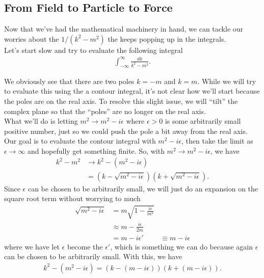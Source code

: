 \documentclass{book}
\theoremstyle{definition}
\newcommand{\f}[2]{\frac{#1}{#2}}
\begin{document}
\newpage




\subsection{From Field to Particle to Force}

Now that we've had the mathematical machinery in hand, we can tackle our worries about the $1/(k^2 - m^2)$ the keeps popping up in the integrals. \\

Let's start slow and try to evaluate the following integral
\begin{align}
\int^\infty_{-\infty} \f{dk}{k^2 - m^2}.
\end{align}

We obviously see that there are two poles $k =-m$ and $k = m$. While we will try to evaluate this using the a contour integral, it's not clear how we'll start because the poles are on the real axis. To resolve this slight issue, we will ``tilt'' the complex plane so that the ``poles'' are no longer on the real axis. \\

What we'll do is letting $m^2 \to m^2 - i\epsilon$ where $\epsilon > 0$ is some arbitrarily small positive number, just so we could push the pole a bit away from the real axis. Our goal is to evaluate the contour integral with $m^2 - i\epsilon$, then take the limit as $\epsilon\to \infty$ and hopefully get something finite. So, with $m^2 \to m^2 - i\epsilon$, we have
\begin{align}
k^2 - m^2 &\to k^2 - (m^2 - i\epsilon) \\ 
&= (k - \sqrt{m^2 - i\epsilon})(k + \sqrt{m^2 - i\epsilon}). 
\end{align}
Since $\epsilon$ can be chosen to be arbitrarily small, we will just do an expansion on the square root term without worrying to much
\begin{align}
\sqrt{m^2 - i\epsilon} &= m\sqrt{1 - \f{i\epsilon}{m^2}} \\ 
&\approx m - \f{i\epsilon}{2m} \\ 
&= m - i\epsilon' 
&\equiv m - i\epsilon
\end{align}
where we have let $\epsilon$ become the $\epsilon'$, which is something we can do because again $\epsilon$ can be chosen to be arbitrarily small. With this, we have
\begin{align}
k^2 - (m^2 - i\epsilon) = (k - (m - i\epsilon))(k + (m - i\epsilon)).
\end{align}
\end{document}

